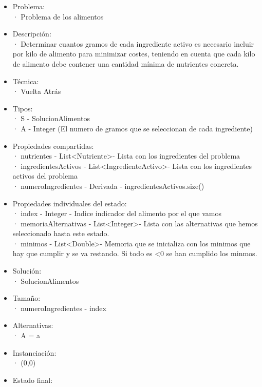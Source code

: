 \documentclass[a4paper,12pt]{article}
\begin{document}
\begin{itemize}

\item Problema: \\
      · Problema de los alimentos
\item Descripción: \\
· Determinar cuantos gramos de cada ingrediente activo es necesario incluir por kilo
de alimento para minimizar costes, teniendo en cuenta que cada kilo de alimento debe
contener una cantidad mínima de nutrientes concreta.
\item Técnica:\\      · Vuelta Atrás
\item Tipos:\\
      · S - SolucionAlimentos\\
      · A - Integer \in [0,1000] (El numero de gramos que se seleccionan de cada ingrediente)
\item Propiedades compartidas:\\
      · nutrientes - List\textless Nutriente\textgreater - Lista con los ingredientes del problema\\
      · ingredientesActivos - List\textless IngredienteActivo\textgreater - Lista con los ingredientes activos del problema\\
      · numeroIngredientes - Derivada - ingredientesActivos.size()
\item Propiedades individuales del estado:\\
      · index - Integer - Indice indicador del alimento por el que vamos\\
      · memoriaAlternativas - List\textless Integer\textgreater - Lista con las alternativas que hemos seleccionado hasta este estado.\\
      · minimos - List\textless Double\textgreater - Memoria que se inicializa con los minimos que hay que cumplir y se va restando. Si todo es <0 se han cumplido los minmos.
\item Solución:\\
      · SolucionAlimentos
\item Tamaño:\\
      · numeroIngredientes - index
\item Alternativas:\\
      · A = {a \in [1,1000]}
\item Instanciación:\\
      · (0,0)
\item Estado final:\\

\end{itemize}
\end{document}
